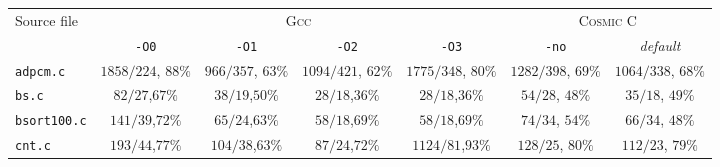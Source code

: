 \begin{tabular}{ |l| |c|c|c|c| |c|c| }
  \hline
  \multirow{2}{*}{Source file}
  & \multicolumn{4}{c||}{\textsc{Gcc}}
  & \multicolumn{2}{c|}{\textsc{Cosmic C}}

  \\\cline{2-7}
  & \multicolumn{1}{c|}{\texttt{-O0}} & \multicolumn{1}{c|}{\texttt{-O1}} & \multicolumn{1}{c|}{\texttt{-O2}} & \multicolumn{1}{c||}{\texttt{-O3}}
  & \multicolumn{1}{c|}{\texttt{-no}} & \multicolumn{1}{c|}{\emph{default}}

  \\\hline\hline
  \verb|adpcm.c|
  & $1858/224$, $88\%$ & $966/357$, $63\%$ & $1094/421$, $62\%$ & $1775/348$, $80\%$
&               $1282/398$,                $69\%$ &               $1064/338$,                $68\%$
  
  \\\hline
  \verb|bs.c|
  & \hspace{1em}$   82/27$,\hspace{.5em}$67\%$ & \hspace{.5em}$  38/19$,\hspace{.5em}$50\%$ & \hspace{1em}$   28/18$,\hspace{.5em}$36\%$ & \hspace{1em}$   28/18$,\hspace{.5em}$36\%$
& \hspace{1em}$54/28$,    \hspace{.5em}$48\%$ & \hspace{1em}$35/18$,     \hspace{.5em}$49\%$

  \\\hline
  \verb|bsort100.c|
  & \hspace{.5em}$  141/39$,\hspace{.5em}$72\%$ & \hspace{.5em}$  65/24$,\hspace{.5em}$63\%$ & \hspace{1em}$   58/18$,\hspace{.5em}$69\%$ & \hspace{1em}$   58/18$,\hspace{.5em}$69\%$
& \hspace{1em}$74/34$,    \hspace{.5em}$54\%$ & \hspace{1em}$66/34$,     \hspace{.5em}$48\%$

  \\\hline
  \verb|cnt.c|
  & \hspace{.5em}$  193/44$,\hspace{.5em}$77\%$ & $ 104/38$,\hspace{.5em}$63\%$ & \hspace{1em}$   87/24$,\hspace{.5em}$72\%$ & $ 1124/81$,\hspace{.5em}$93\%$
& \hspace{.5em}$128/25$,    \hspace{.5em}$80\%$ & \hspace{.5em}$112/23$,    \hspace{.5em}$79\%$


\end{tabular}

